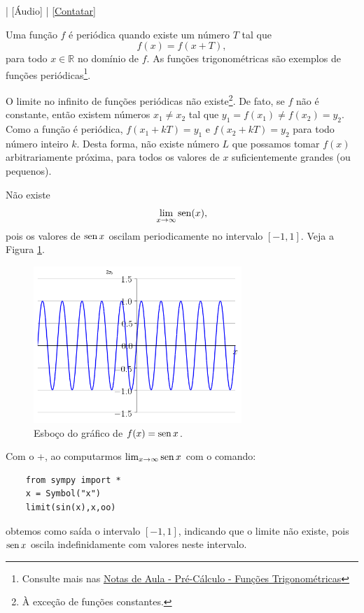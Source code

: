 \begin{flushright}
  [Vídeo] | [Áudio] | \href{https://phkonzen.github.io/notas/contato.html}{[Contatar]}
\end{flushright}

Uma função $f$ é periódica quando existe um número $T$ tal que
\begin{equation}
  f(x) = f(x+T),
\end{equation}
para todo $x\in\mathbb{R}$ no domínio de $f$. As funções trigonométricas são exemplos de funções periódicas\footnote{Consulte mais nas \href{https://phkonzen.github.io/notas/PreCalculo/cap\_funcao\_sec\_funtri.html}{Notas de Aula - Pré-Cálculo - Funções Trigonométricas}}.

O limite no infinito de funções periódicas não existe\footnote{À exceção de funções constantes.}. De fato, se $f$ não é constante, então existem números $x_1\neq x_2$ tal que $y_1=f(x_1)\neq f(x_2)=y_2$. Como a função é periódica, $f(x_1+kT)=y_1$ e $f(x_2+kT) = y_2$ para todo número inteiro $k$. Desta forma, não existe número $L$ que possamos tomar $f(x)$ arbitrariamente próxima, para todos os valores de $x$ suficientemente grandes (ou pequenos).

\begin{ex}
  Não existe
  \begin{equation}
    \lim_{x\to \infty} \operatorname{sen}(x),
  \end{equation}
  pois os valores de $\operatorname{sen} x$ oscilam periodicamente no intervalo $[-1, 1]$. Veja a Figura \ref{fig:lim_senx_xinf}.

  \begin{figure}[H]
    \centering
    \includegraphics[width=0.7\textwidth]{./cap_lim/dados/fig_lim_senx_xinf/fig_lim_senx_xinf}
    \caption{Esboço do gráfico de $f(x)=\operatorname{sen} x$.}
    \label{fig:lim_senx_xinf}
  \end{figure}

  \ifispython
  Com o {\python}+{\sympy}, ao computarmos $\lim_{x\to \infty} \operatorname{sen} x$ com o comando:
  \begin{lstlisting}
    from sympy import *
    x = Symbol("x")
    limit(sin(x),x,oo)
  \end{lstlisting}
  obtemos como saída o intervalo $[-1, 1]$, indicando que o limite não existe, pois $\operatorname{sen} x$ oscila indefinidamente com valores neste intervalo.
  \fi
\end{ex}



